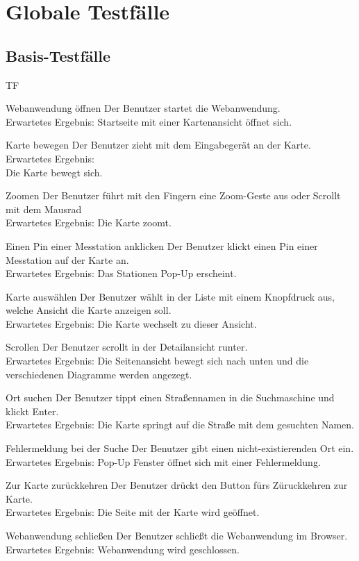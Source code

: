\section{Globale Testfälle}
\setcounter{counter}{10}
\subsection{Basis-Testfälle}
\begin{Kriterien}{TF}

	\item[Webanwendung öffnen] Der Benutzer startet die \gls{Webanwendung}. \\ Erwartetes Ergebnis: Startseite mit einer Kartenansicht öffnet sich.

	\item[Karte bewegen] Der Benutzer zieht mit dem Eingabegerät an der Karte. Erwartetes Ergebnis: \\ Die Karte bewegt sich.
	
	\item[Zoomen] Der Benutzer führt mit den Fingern eine Zoom-Geste aus oder Scrollt mit dem Mausrad \\ Erwartetes Ergebnis: Die Karte zoomt.
	
	\item[Einen Pin einer Messtation anklicken] Der Benutzer klickt einen Pin einer Messtation auf der Karte an. \\ Erwartetes Ergebnis: Das Stationen Pop-Up erscheint.
	
	\item[Karte auswählen] Der Benutzer wählt in der Liste mit einem Knopfdruck aus, welche Ansicht die Karte anzeigen soll. \\ Erwartetes Ergebnis: Die Karte wechselt zu dieser Ansicht.
	
	\item[Scrollen] Der Benutzer scrollt in der Detailansicht runter. \\ Erwartetes Ergebnis: Die Seitenansicht bewegt sich nach unten und die verschiedenen Diagramme werden angezegt.
	
	\item[Ort suchen] Der Benutzer tippt einen Straßennamen in die Suchmaschine und klickt Enter. \\ Erwartetes Ergebnis: Die Karte springt auf die Straße mit dem gesuchten Namen.
	
	\item[Fehlermeldung bei der Suche] Der Benutzer gibt einen nicht-existierenden Ort ein. \\ Erwartetes Ergebnis: Pop-Up Fenster öffnet sich mit einer Fehlermeldung.
	
	\item[Zur Karte zurückkehren] Der Benutzer drückt den Button fürs Züruckkehren zur Karte. \\ Erwartetes Ergebnis: Die Seite mit der Karte wird geöffnet. 
	
	\item[Webanwendung schließen] Der Benutzer schließt die Webanwendung im Browser. \\ Erwartetes Ergebnis: Webanwendung wird geschlossen.
\end{Kriterien}
